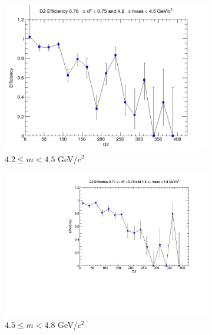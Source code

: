 \begin{figure}[p]
    \centering
    \begin{subfigure}[b]{0.32\textwidth}
        \centering
        \includegraphics[width=\textwidth]{./kTrackerEfficiencyPlots/D2_Efficiency_xF14_mass0.png}
        \caption{$4.2 \leq m < 4.5$ GeV/$c^2$}
        \label{fig:xF14_mass0}
    \end{subfigure}
    \hfill
    \begin{subfigure}[b]{0.32\textwidth}
        \centering
        \includegraphics[width=\textwidth]{./kTrackerEfficiencyPlots/D2_Efficiency_xF14_mass1.pdf}
        \caption{$4.5 \leq m < 4.8$ GeV/$c^2$}
        \label{fig:xF14_mass1}
    \end{subfigure}
    \hfill
    \begin{subfigure}[b]{0.32\textwidth}

\end{subfigure}
\end{figure}
